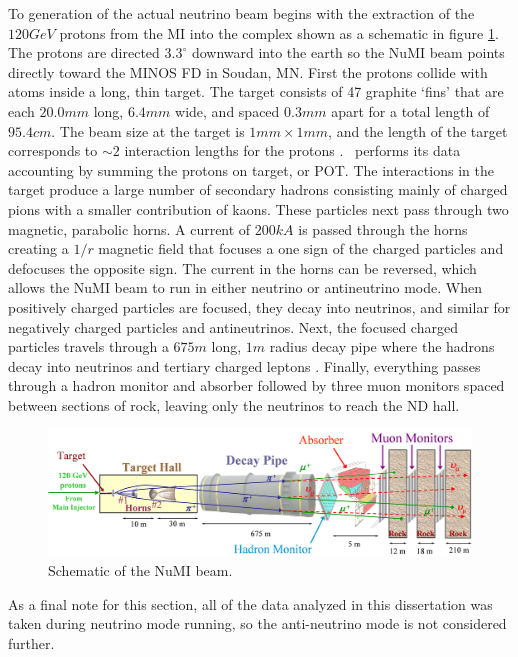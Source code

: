 To generation of the actual neutrino beam begins with the extraction of the $120\unit{GeV}$ protons from the MI into the complex shown as a schematic in figure \ref{fig:FNAL_NuMI}. The protons are directed $3.3^\circ$ downward into the earth so the NuMI beam points directly toward the MINOS FD in Soudan, MN. First the protons collide with atoms inside a long, thin target. The target consists of 47 graphite `fins' that are each $20.0\unit{mm}$ long, $6.4\unit{mm}$ wide, and spaced $0.3\unit{mm}$ apart for a total length of $95.4\unit{cm}$. The beam size at the target is $1\unit{mm} \times 1\unit{mm}$, and the length of the target corresponds to ${\sim}2$ interaction lengths for the protons \cite{ref:TDRNuMI}. \nova~performs its data accounting by summing the protons on target, or POT. The interactions in the target produce a large number of secondary hadrons consisting mainly of charged pions with a smaller contribution of kaons. These particles next pass through two magnetic, parabolic horns. A current of $200\unit{kA}$ is passed through the horns creating a $1/r$ magnetic field that focuses a one sign of the charged particles and defocuses the opposite sign. The current in the horns can be reversed, which allows the NuMI beam to run in either neutrino or antineutrino mode. When positively charged particles are focused, they decay into neutrinos, and similar for negatively charged particles and antineutrinos. Next, the focused charged particles travels through a $675\unit{m}$ long, $1\unit{m}$ radius decay pipe where the hadrons decay into neutrinos and tertiary charged leptons \cite{ref:TDRNOvA}. Finally, everything passes through a hadron monitor and absorber followed by three muon monitors spaced between sections of rock, leaving only the neutrinos to reach the ND hall.
\begin{figure}[htb]
  \centering
  \includegraphics[width=1\textwidth]{figures/FNAL_NuMI.png}
  \caption[NuMI Beam Schematic]{Schematic of the NuMI beam.}
  \label{fig:FNAL_NuMI}
\end{figure}

As a final note for this section, all of the data analyzed in this dissertation was taken during neutrino mode running, so the anti-neutrino mode is not considered further.

